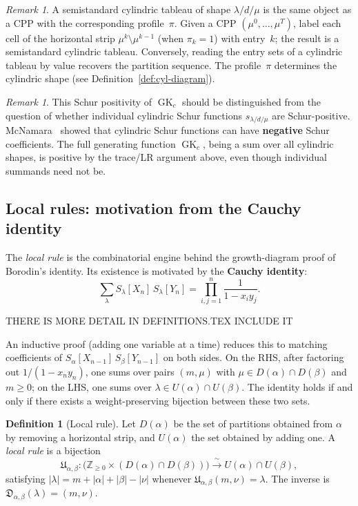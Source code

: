 \documentclass[11pt]{article}
\theoremstyle{plain}
\theoremstyle{definition}
\newtheorem{definition}[theorem]{Definition}
\theoremstyle{remark}
\newtheorem{remark}[theorem]{Remark}
\newcommand{\Z}{\mathbb{Z}}
\newcommand{\GK}{\operatorname{GK}}
\begin{document}
\begin{remark}
A semistandard cylindric tableau of shape $\lambda/d/\mu$ is
the same object as a CPP with the corresponding profile~$\pi$.
Given a CPP $(\mu^0, \ldots, \mu^T)$, label each cell of the
horizontal strip $\mu^k \setminus \mu^{k-1}$ (when $\pi_k = 1$)
with entry~$k$; the result is a semistandard cylindric tableau.
Conversely, reading the entry sets of a cylindric tableau by
value recovers the partition sequence.
The profile~$\pi$ determines the cylindric shape
(see Definition~\ref{def:cyl-diagram}).
\end{remark}

\begin{remark}
This Schur positivity of $\GK_c$ should be distinguished from
the question of whether individual cylindric Schur functions
$s_{\lambda/d/\mu}$ are Schur-positive. McNamara~\cite{mcnamara-2006}
showed that cylindric Schur functions can have
\textbf{negative} Schur coefficients.
The full generating function $\GK_c$, being a sum over all
cylindric shapes, is positive by the trace/LR argument above,
even though individual summands need not be.
\end{remark}

\subsection{Local rules: motivation from the Cauchy identity}
\label{sec:local-rules}

The \emph{local rule} is the combinatorial engine behind the
growth-diagram proof of Borodin's identity.
Its existence is motivated by the \textbf{Cauchy identity}:
\[
  \sum_\lambda S_\lambda[X_n]\, S_\lambda[Y_n]
  = \prod_{i,j=1}^n \frac{1}{1 - x_i y_j}.
\]

THERE IS MORE DETAIL IN DEFINITIONS.TEX INCLUDE IT

An inductive proof (adding one variable at a time) reduces this
to matching coefficients of $S_\alpha[X_{n-1}]\, S_\beta[Y_{n-1}]$
on both sides.  On the RHS, after factoring out
$1/(1 - x_n y_n)$, one sums over pairs $(m, \mu)$ with
$\mu \in D(\alpha) \cap D(\beta)$ and $m \geq 0$; on the LHS,
one sums over $\lambda \in U(\alpha) \cap U(\beta)$.
The identity holds if and only if there exists a
weight-preserving bijection between these two sets.

\begin{definition}[Local rule]\label{def:local-rule}
Let $D(\alpha)$ be the set of partitions obtained from $\alpha$
by removing a horizontal strip, and $U(\alpha)$ the set obtained
by adding one.
A \emph{local rule} is a bijection
\[
  \mathfrak{U}_{\alpha,\beta} :
  \bigl(\Z_{\geq 0} \times (D(\alpha) \cap D(\beta))\bigr)
  \xrightarrow{\;\sim\;}
  U(\alpha) \cap U(\beta),
\]
satisfying $|\lambda| = m + |\alpha| + |\beta| - |\nu|$
whenever $\mathfrak{U}_{\alpha,\beta}(m, \nu) = \lambda$.
The inverse is
$\mathfrak{D}_{\alpha,\beta}(\lambda) = (m, \nu)$.
\end{definition}
\end{document}
